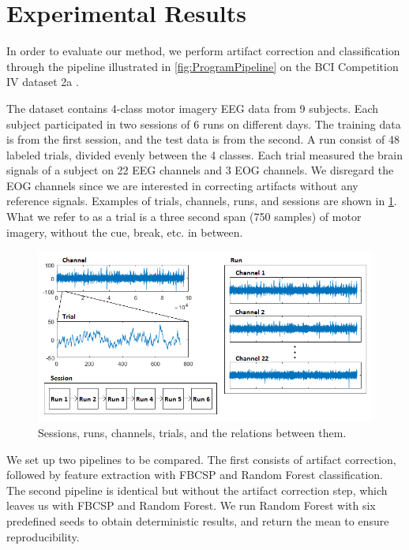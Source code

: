 \section{Experimental Results}\label{sec:results}
In order to evaluate our method, we perform artifact correction and classification through the pipeline illustrated in \cref{fig:ProgramPipeline} on the BCI Competition IV dataset 2a \citep{brunner2008bci}.

The dataset contains 4-class motor imagery EEG data from 9 subjects. Each subject participated in two sessions of 6 runs on different days. The training data is from the first session, and the test data is from the second. A run consist of 48 labeled trials, divided evenly between the 4 classes. Each trial measured the brain signals of a subject on 22 EEG channels and 3 EOG channels. We disregard the EOG channels since we are interested in correcting artifacts without any reference signals. Examples of trials, channels, runs, and sessions are shown in \cref{fig:dataset}. What we refer to as a trial is a three second span (750 samples) of motor imagery, without the cue, break, etc. in between.

\begin{figure}
	\centering
	\begin{adjustbox}{width=\textwidth}
		\includegraphics{figures/bciiv2a.png}
	\end{adjustbox}
	\caption{Sessions, runs, channels, trials, and the relations between them.}
	\label{fig:dataset}
\end{figure}

We set up two pipelines to be compared. The first consists of artifact correction, followed by feature extraction with FBCSP and Random Forest classification. The second pipeline is identical but without the artifact correction step, which leaves us with FBCSP and Random Forest. We run Random Forest with six predefined seeds to obtain deterministic results, and return the mean to ensure reproducibility.

